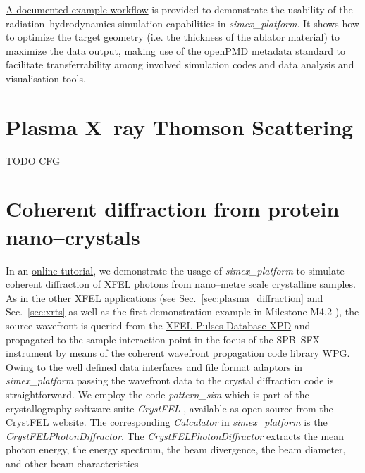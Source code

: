 \documentclass[12pt]{scrartcl}
\begin{document}


\href{https://www.github.com/eucall-software/simex_platform/wiki/Esther-Hydrocode-Tutorial}{A
documented example workflow} is provided to demonstrate the usability of the
radiation--hydrodynamics simulation capabilities in \textit{simex\_platform}. It
shows how to optimize the target geometry (i.e. the thickness of the ablator
material) to maximize the data output, making use of the openPMD metadata
standard to facilitate transferrability among involved simulation codes and
data analysis and visualisation tools.

\section{Plasma X--ray Thomson Scattering\label{sec:xrts}}
TODO CFG
%
\section{Coherent diffraction from protein nano--crystals\label{sec:protein_sfx}}
In an
\href{https://github.com/eucall-software/simex_platform/wiki/Tutorial-on-nano-crystal-diffraction}{online
tutorial}, we demonstrate the usage of \textit{simex\_platform} to simulate
coherent diffraction of XFEL photons from nano--metre scale crystalline samples.
As in the other XFEL applications (see Sec.~\ref{sec:plasma_diffraction} and
Sec.~\ref{sec:xrts} as well as the first demonstration example in Milestone
M4.2 \cite{EUCALL_SIMEX_M4.2}), the source wavefront is queried from the
\href{https://in.xfel.eu/xpd}{XFEL Pulses Database XPD} and propagated to the
sample interaction point in the focus of the SPB--SFX instrument by means of
the coherent wavefront propagation code library WPG. Owing to the well defined
data interfaces and file format adaptors in \textit{simex\_platform} passing the
wavefront data to the crystal diffraction code is straightforward. We employ the
code \textit{pattern\_sim} which is part of the crystallography software suite
\textit{CrystFEL} \cite{White2012}, available as open source from the
\href{https://www.desy.de/~twhite/crystfel}{CrystFEL website}. The
corresponding \textit{Calculator} in \textit{simex\_platform} is the
\href{https://eucall-software.github.io/simex_platform/#SimEx.Calculators.CrystFELPhotonDiffractor.CrystFELPhotonDiffractor}{\textit{CrystFELPhotonDiffractor}}.
The \textit{CrystFELPhotonDiffractor} extracts the mean photon energy, the energy
spectrum, the beam divergence, the beam diameter, and other beam characteristics
\end{document}
